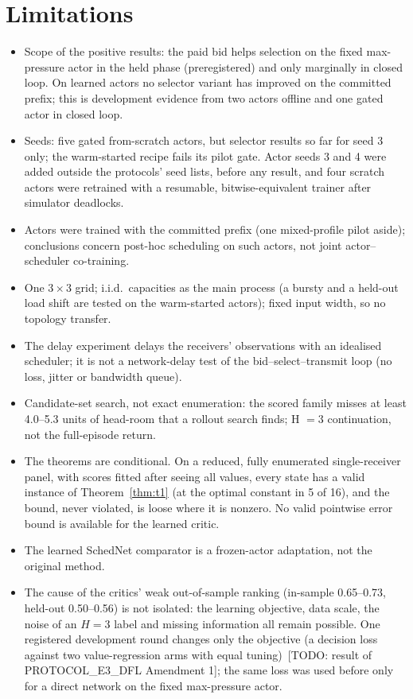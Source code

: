 \documentclass[11pt]{article}
\theoremstyle{definition}
\newif\ifshownotes\shownotestrue
\newcommand{\TODO}[1]{\ifshownotes{\color{todocol}\,\textsf{\footnotesize[TODO: #1]}}\fi}
\begin{document}
\section{Limitations}
\begin{itemize}
\item Scope of the positive results: the paid bid helps selection on the fixed max-pressure actor in
the held phase (preregistered) and only marginally in closed loop. On learned actors no selector
variant has improved on the committed prefix; this is development evidence from two actors offline and
one gated actor in closed loop.
\item Seeds: five gated from-scratch actors, but selector results so far for seed 3 only; the
warm-started recipe fails its pilot gate. Actor seeds 3 and 4 were added outside the protocols' seed
lists, before any result, and four scratch actors were retrained with a resumable, bitwise-equivalent
trainer after simulator deadlocks.
\item Actors were trained with the committed prefix (one mixed-profile pilot aside); conclusions concern
post-hoc scheduling on such actors, not joint actor--scheduler co-training.
\item One $3\times3$ grid; i.i.d.\ capacities as the main process (a bursty and a held-out load shift are
tested on the warm-started actors); fixed input width, so no topology transfer.
\item The delay experiment delays the receivers' observations with an idealised scheduler; it is not
a network-delay test of the bid--select--transmit loop (no loss, jitter or bandwidth queue).
\item Candidate-set search, not exact enumeration: the scored family misses at least 4.0--5.3 units of
head-room that a rollout search finds; H $=3$ continuation, not the full-episode return.
\item The theorems are conditional. On a reduced, fully enumerated single-receiver panel, with scores
fitted after seeing all values, every state has a valid instance of Theorem~\ref{thm:t1} (at the
optimal constant in 5 of 16), and the bound, never violated, is loose where it is nonzero. No valid pointwise error bound is available
for the learned critic.
\item The learned SchedNet comparator is a frozen-actor adaptation, not the original method.
\item The cause of the critics' weak out-of-sample ranking (in-sample 0.65--0.73, held-out 0.50--0.56) is not isolated: the
learning objective, data scale, the noise of an $H=3$ label and missing information all remain possible. One
registered development round changes only the objective (a decision loss against two value-regression arms with equal
tuning) \TODO{result of PROTOCOL\_E3\_DFL Amendment 1}; the same loss was used before only for a direct network on the
fixed max-pressure actor.
\end{itemize}
\end{document}
